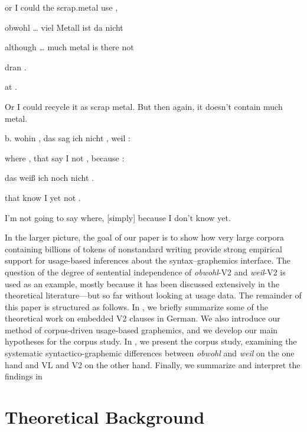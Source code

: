 or  I  could    the  scrap.metal    use    ,



obwohl  …  viel    Metall  ist  da  nicht



although  …  much    metal    is  there  not



dran  .



at  .



Or I could recycle it as scrap metal. But then again, it doesn’t con\-tain much metal.



b.  wohin  ,  das  sag  ich  nicht  ,  weil    :



where  ,  that  say  I  not  ,  because  :



das  weiß  ich  noch    nicht  .



that  know  I  yet    not  .



I’m not going to say where, [simply] because I don’t know yet.



In the larger picture, the goal of our paper is to show how very large corpora containing billions of tokens of nonstandard writing provide strong empirical support for usage-based inferences about the syntax–graphemics interface. The question of the degree of sentential independence of \textit{obwohl}{}-V2 and \textit{weil}{}-V2 is used as an example, mostly because it has been discussed extensively in the theoretical literature—but so far without looking at usage data. The remainder of this paper is structured as follows. In , we briefly summarize some of the theo\-retical work on embedded V2 clauses in German. We also introduce our method of corpus-driven usage-based graphemics, and we develop our main hypotheses for the corpus study. In , we present the corpus study, examining the systematic syntactico-graphemic differences between \textit{obwohl} and \textit{weil} on the one hand and VL and V2 on the other hand. Finally, we summarize and interpret the findings in 



\section{Theoretical Background}



